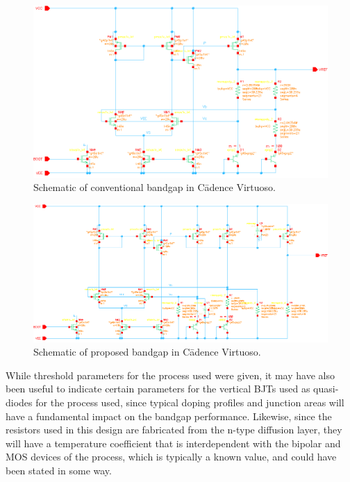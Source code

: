 \documentclass[journal]{IEEEtran}
\begin{document}
\begin{figure}[!t]
    \centering
    \includegraphics[width=\columnwidth]{images/bg_conv.eps}
    \caption{Schematic of conventional bandgap in C\=adence Virtuoso.} \label{fig:cadence_conv}
\end{figure}

\begin{figure}[!t]
    \centering
    \includegraphics[width=\columnwidth]{images/bg_prop.eps}
    \caption{Schematic of proposed bandgap in C\=adence Virtuoso.} \label{fig:cadence_prop} 
\end{figure}

While threshold parameters for the process used were given, it may have also been useful to indicate certain parameters for the vertical BJTs used as quasi-diodes for the process used, since typical doping profiles and junction areas will have a fundamental impact on the bandgap performance. Likewise, since the resistors used in this design are fabricated from the n-type diffusion layer, they will have a temperature coefficient that is interdependent with the bipolar and MOS devices of the process, which is typically a known value, and could have been stated in some way.
\end{document}
